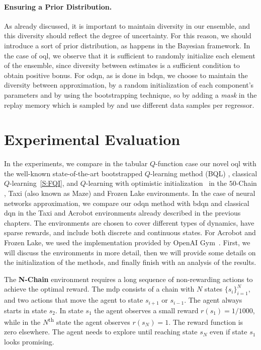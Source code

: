 \paragraph{Ensuring a Prior Distribution.} As already discussed, it is important to maintain diversity in our ensemble, and this diversity should reflect the degree of uncertainty. For this reason, we should introduce a sort of prior distribution, as happens in the Bayesian framework. In the case of \gls{oql}, we observe that it is sufficient to randomly initialize each element of the ensemble, since diversity between estimates is a sufficient condition to obtain positive bonus.
For \gls{odqn}, as is done in \gls{bdqn}, we choose to maintain the diversity between approximation, by a random initialization of each component's parameters and by using the bootstrapping technique, so by adding a \textsl{mask} in the replay memory which is sampled by  and use different data samples per regressor.

\section{Experimental Evaluation}
\label{S:odqn_experiments}
In the experiments, we compare in the tabular $Q$-function case our novel \gls{oql} with the well-known state-of-the-art bootstrapped $Q$-learning method (BQL) \cite{osband2016deep}, classical $Q$-learning~\ref{S:FQI}, and $Q$-learning with optimistic initialization~\cite{sutton1998reinforcement} in the $50$-Chain \cite{osband2016deep}, Taxi (also known as Maze) \cite{dearden1998bayesian} and Frozen Lake \cite{brockman2016openai} environments. In the case of neural networks approximation, we compare our \gls{odqn} method with \gls{bdqn} and classical \gls{dqn} in the Taxi and Acrobot environments already described in the previous chapters.
The environments are chosen to cover different types of dynamics, have sparse rewards, and include both discrete and continuous states. For Acrobot and Frozen Lake, we used the implementation provided by OpenAI Gym~\cite{brockman2016openai}. First, we will discuss the environments in more detail, then we will provide some details on the
initialization of the methods, and finally finish with an analysis of the results.

The \textbf{N-Chain} environment \cite{osband2016deep} requires a long sequence of non-rewarding actions to achieve the optimal reward. The \gls{mdp} consists of a chain with $N$ states $\{s_i\}_{i=1}^N$, and two actions that move the agent to state $s_{i+1}$ or $s_{i-1}$. The agent always starts in state $s_2$. In state $s_1$ the agent observes a small reward $r(s_1)=1/1000$, while in the $N$\textsuperscript{th} state the agent observes $r(s_N) = 1$. The reward function is zero elsewhere. The agent needs to explore until reaching state $s_N$ even if state $s_1$ looks promising.
   
